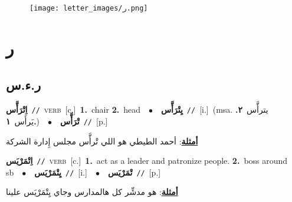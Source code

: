 \documentclass[10pt,a4paper,twoside]{article} %
\begin{document}
\begin{figure*}[t!]\centering\texttt{[image: letter\_images/ر.png]}\end{figure*}
\color{white}

 \section*{\foreignlanguage{arabic}{ر}} 
 \begin{multicols}{2} 

%
\color{black}
\vspace{-3mm}
\subsection*{\color{blue}\foreignlanguage{arabic}{ر.ء.س}\color{blue}{}} 

{\setlength\topsep{0pt}\textbf{\foreignlanguage{arabic}{اِتْرَأَّس}}\ {\color{gray}\texttt{//}\color{black}}\ \textsc{verb}\ [c.]\ \textbf{1.}~chair  \textbf{2.}~head\ \ $\bullet$\ \ \setlength\topsep{0pt}\textbf{\foreignlanguage{arabic}{يِتْرَأَّس}}\ {\color{gray}\texttt{//}\color{black}}\ [i.]\ \color{gray}(msa. \foreignlanguage{arabic}{يترأَّس}~\foreignlanguage{arabic}{\textbf{٢.}}  \foreignlanguage{arabic}{يَرأَس}~\foreignlanguage{arabic}{\textbf{١.}})\color{black}\ \ $\bullet$\ \ \setlength\topsep{0pt}\textbf{\foreignlanguage{arabic}{تْرَأَّس}}\ {\color{gray}\texttt{//}\color{black}}\ [p.]\  \begin{flushright}\color{gray}\foreignlanguage{arabic}{\textbf{\underline{\foreignlanguage{arabic}{أمثلة}}}: أحمد الطيطي هو اللي تْرأَّس مجلس إِدارة الشركة}\end{flushright}\color{black}} \vspace{2mm}

{\setlength\topsep{0pt}\textbf{\foreignlanguage{arabic}{اِتْمَرْيَس}}\ {\color{gray}\texttt{//}\color{black}}\ \textsc{verb}\ [c.]\ \textbf{1.}~act as a leader and patronize people.  \textbf{2.}~boss around sb\ \ $\bullet$\ \ \setlength\topsep{0pt}\textbf{\foreignlanguage{arabic}{يِتْمَرْيَس}}\ {\color{gray}\texttt{//}\color{black}}\ [i.]\ \ $\bullet$\ \ \setlength\topsep{0pt}\textbf{\foreignlanguage{arabic}{تْمَرْيَس}}\ {\color{gray}\texttt{//}\color{black}}\ [p.]\  \begin{flushright}\color{gray}\foreignlanguage{arabic}{\textbf{\underline{\foreignlanguage{arabic}{أمثلة}}}: هو مدشِّر كل هالمدارس وجاي يِتْمَرْيَس علينا}\end{flushright}\color{black}} \vspace{2mm}


\end{multicols}
\end{document}

